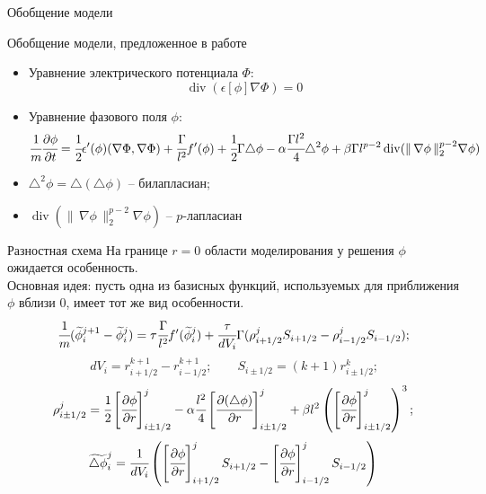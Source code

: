 \documentclass[aspectratio=169]{beamer}
\DeclareMathOperator{\Div}{div}
\begin{document}
\begin{frame}{Обобщение модели}
\begin{block}{Обобщение модели, предложенное в работе \cite{zipunova_higher_codimension}}
\begin{itemize}
	\item Уравнение электрического потенциала $\Phi$:
	$$\Div(\epsilon[\phi] \nabla \Phi) = 0$$
	\item Уравнение фазового поля $\phi$:
	$$\cfrac{1}{m} \cfrac{\partial \phi}{\partial t} =
    \cfrac{1}{2} \epsilon'(\phi) (\nabla \Phi, \nabla \Phi) +
    \cfrac{\Gamma}{l^2} f'(\phi) +
    \cfrac{1}{2} \Gamma \triangle \phi -
    \alpha \cfrac{\Gamma l^2}{4} \triangle^2 \phi +
    \beta \Gamma l^{p - 2} \Div (\| \, \nabla \phi \, \|_2^{p - 2} \nabla \phi)$$
\end{itemize}
\end{block}
\begin{itemize}
	\item $\triangle^2 \phi = \triangle(\triangle \phi)$ -- билапласиан;
	\item $\Div (\| \, \nabla \phi \, \|_2^{p - 2} \nabla \phi)$ -- $p$-лапласиан
\end{itemize}
\end{frame}


\begin{frame}{Разностная схема}
На границе $r = 0$ области моделирования у решения $\phi$ ожидается особенность. \\
Основная идея: пусть одна из базисных функций, используемых для приближения $\phi$ вблизи $0$,
имеет тот же вид особенности.
$$\cfrac{1}{m} (\widetilde{\phi}_i^{j + 1} - \widetilde{\phi}_i^j) = \tau \cfrac{\Gamma}{l^2}
f'(\widetilde{\phi}_i^j) + \cfrac{\tau}{dV_i} \Gamma (\rho_{i + 1/2}^j S_{i + 1/2} -
\rho_{i - 1/2}^j S_{i - 1/2}) \text{;}$$
$$dV_i = r_{i + 1/2}^{k + 1} - r_{i - 1/2}^{k + 1}; \qquad
S_{i \pm 1/2} = (k + 1) r_{i \pm 1/2}^k \text{;}$$
$$\rho_{i \pm 1/2}^j = \cfrac{1}{2}
\left[ \cfrac{\partial \phi}{\partial r} \right]_{i \pm 1/2}^j -
\alpha \cfrac{l^2}{4} \left[ \cfrac{\partial (\triangle \phi)}{\partial r} \right]_{i \pm 1/2}^j +
\beta l^2 \left( \left[ \cfrac{\partial \phi}{\partial r} \right]_{i \pm 1/2}^j \right)^3
\text{;}$$
$$\widetilde{\triangle \phi}_i^j = \cfrac{1}{dV_i}
\left( \left[ \cfrac{\partial \phi}{\partial r} \right]_{i + 1/2}^j S_{i + 1/2} -
\left[ \cfrac{\partial \phi}{\partial r} \right]_{i - 1/2}^j S_{i - 1/2} \right)$$
\end{frame}
\end{document}
